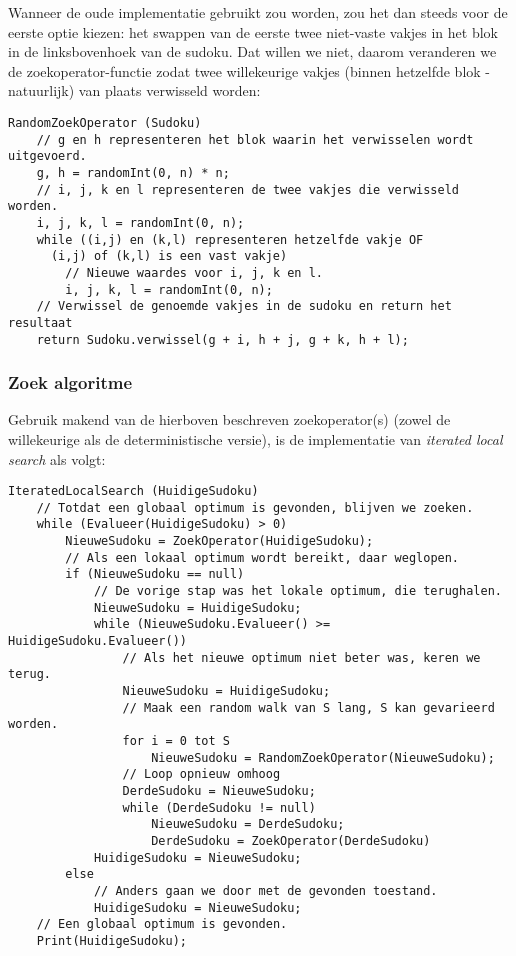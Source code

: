 \documentclass[]{report}
\begin{document}
Wanneer de oude implementatie gebruikt zou worden, zou het dan steeds voor de eerste optie kiezen: het swappen van de eerste twee niet-vaste vakjes in het blok in de linksbovenhoek van de sudoku. Dat willen we niet, daarom veranderen we de zoekoperator-functie zodat twee willekeurige vakjes (binnen hetzelfde blok - natuurlijk) van plaats verwisseld worden:

\begin{minipage}{\textwidth}
\begin{lstlisting}
RandomZoekOperator (Sudoku)
	// g en h representeren het blok waarin het verwisselen wordt uitgevoerd.
	g, h = randomInt(0, n) * n;
	// i, j, k en l representeren de twee vakjes die verwisseld worden.
	i, j, k, l = randomInt(0, n);
	while ((i,j) en (k,l) representeren hetzelfde vakje OF
	  (i,j) of (k,l) is een vast vakje)
		// Nieuwe waardes voor i, j, k en l.
		i, j, k, l = randomInt(0, n);
	// Verwissel de genoemde vakjes in de sudoku en return het resultaat
	return Sudoku.verwissel(g + i, h + j, g + k, h + l);
\end{lstlisting}
\end{minipage}

\subsubsection{Zoek algoritme}
Gebruik makend van de hierboven beschreven zoekoperator(s) (zowel de willekeurige als de deterministische versie), is de implementatie van \textit{iterated local search} als volgt:

\begin{minipage}{\textwidth}
\begin{lstlisting}
IteratedLocalSearch (HuidigeSudoku)
	// Totdat een globaal optimum is gevonden, blijven we zoeken.
	while (Evalueer(HuidigeSudoku) > 0)
		NieuweSudoku = ZoekOperator(HuidigeSudoku);
		// Als een lokaal optimum wordt bereikt, daar weglopen.
		if (NieuweSudoku == null)
			// De vorige stap was het lokale optimum, die terughalen.
			NieuweSudoku = HuidigeSudoku;
			while (NieuweSudoku.Evalueer() >= HuidigeSudoku.Evalueer())
				// Als het nieuwe optimum niet beter was, keren we terug.
				NieuweSudoku = HuidigeSudoku; 
				// Maak een random walk van S lang, S kan gevarieerd worden.
				for i = 0 tot S
					NieuweSudoku = RandomZoekOperator(NieuweSudoku);
				// Loop opnieuw omhoog
				DerdeSudoku = NieuweSudoku; 
				while (DerdeSudoku != null)
					NieuweSudoku = DerdeSudoku;
					DerdeSudoku = ZoekOperator(DerdeSudoku)
			HuidigeSudoku = NieuweSudoku;
		else 
			// Anders gaan we door met de gevonden toestand.
			HuidigeSudoku = NieuweSudoku;
	// Een globaal optimum is gevonden.
	Print(HuidigeSudoku);
\end{lstlisting}
\end{minipage}
\end{document}
